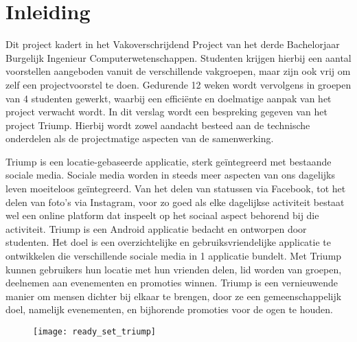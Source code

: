 \chapter{Inleiding}
Dit project kadert in het Vakoverschrijdend Project van het derde Bachelorjaar Burgelijk Ingenieur Computerwetenschappen. Studenten krijgen hierbij een aantal voorstellen aangeboden vanuit de verschillende vakgroepen, maar zijn ook vrij om zelf een projectvoorstel te doen. Gedurende 12 weken wordt vervolgens in groepen van 4 studenten gewerkt, waarbij een efficiënte en doelmatige aanpak van het project verwacht wordt. In dit verslag wordt een bespreking gegeven van het project Triump. Hierbij wordt zowel aandacht besteed aan de technische onderdelen als de projectmatige aspecten van de samenwerking.


Triump is een locatie-gebaseerde applicatie, sterk geïntegreerd met bestaande sociale media.
Sociale media worden in steeds meer aspecten van ons dagelijks leven                                                      moeiteloos geïntegreerd. Van het delen van statussen via Facebook, tot het delen van foto’s via Instagram, voor zo goed als elke dagelijkse activiteit bestaat wel een online platform dat inspeelt op het sociaal aspect behorend bij die activiteit.
Triump is een Android applicatie bedacht en ontworpen door studenten. Het doel is een overzichtelijke en gebruiksvriendelijke applicatie te ontwikkelen die verschillende sociale media in 1 applicatie bundelt. 
Met Triump kunnen gebruikers hun locatie met hun vrienden delen, lid worden van groepen, deelnemen aan evenementen en promoties winnen.
Triump is een vernieuwende manier om mensen dichter bij elkaar te brengen, door ze een gemeenschappelijk doel, namelijk evenementen, en bijhorende promoties voor de ogen te houden.

\begin{figure}[H]
	\centering
	\texttt{[image: ready\_set\_triump]}
	\label{fig:inleiding}
	
\end{figure}
